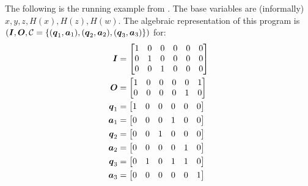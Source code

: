 The following is the running example from \cite{TCC:McQSwoRos19}.
The base variables are (informally) $x,y,z,H(x),H(z),H(w)$.
The algebraic representation of this program is $(\boldsymbol{I}, \boldsymbol{O}, \mathcal{C} = \{(\boldsymbol q_1, \boldsymbol a_1), (\boldsymbol q_2, \boldsymbol a_2), (\boldsymbol q_3, \boldsymbol a_3)\})$ for:
\begin{align*}
\boldsymbol{I}    &= \begin{bmatrix}
            1 & 0 & 0 & 0 & 0 & 0 \\
            0 & 1 & 0 & 0 & 0 & 0 \\
            0 & 0 & 1 & 0 & 0 & 0 
            \end{bmatrix} \\
\boldsymbol{O}    &= \begin{bmatrix}
            1 & 0 & 0 & 0 & 0 & 1 \\
            0 & 0 & 0 & 0 & 1 & 0 
            \end{bmatrix} \\
\boldsymbol q_1 &= \begin{bmatrix}1 & 0 & 0 & 0 & 0 & 0\end{bmatrix} \\
\boldsymbol a_1 &= \begin{bmatrix}0 & 0 & 0 & 1 & 0 & 0\end{bmatrix} \\
\boldsymbol q_2 &= \begin{bmatrix}0 & 0 & 1 & 0 & 0 & 0\end{bmatrix} \\
\boldsymbol a_2 &= \begin{bmatrix}0 & 0 & 0 & 0 & 1 & 0\end{bmatrix} \\
\boldsymbol q_3 &= \begin{bmatrix}0 & 1 & 0 & 1 & 1 & 0\end{bmatrix} \\
\boldsymbol a_3 &= \begin{bmatrix}0 & 0 & 0 & 0 & 0 & 1\end{bmatrix} \\
\end{align*}

